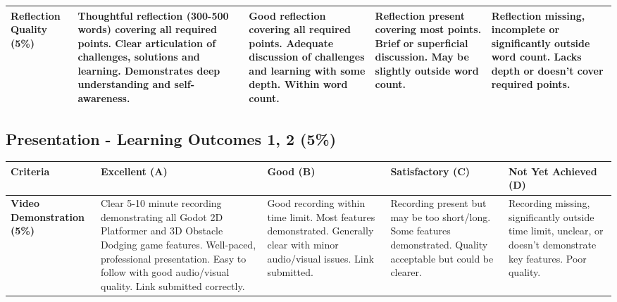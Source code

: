 \documentclass{article}
\begin{document}
\begin{landscape}
\begin{tabular}{|p{5cm}|p{4cm}|p{4cm}|p{4cm}|p{4cm}|}
\textbf{Reflection Quality (5\%)} & 
Thoughtful reflection (300-500 words) covering all required points. Clear articulation of challenges, solutions and learning. Demonstrates deep understanding and self-awareness. & 
Good reflection covering all required points. Adequate discussion of challenges and learning with some depth. Within word count. & 
Reflection present covering most points. Brief or superficial discussion. May be slightly outside word count. & 
Reflection missing, incomplete or significantly outside word count. Lacks depth or doesn't cover required points. \\ \hline

\end{tabular}

\subsection*{Presentation - Learning Outcomes 1, 2 (5\%)}

\begin{tabular}{|p{5cm}|p{4cm}|p{4cm}|p{4cm}|p{4cm}|}
\hline
\textbf{Criteria} & \textbf{Excellent (A)} & \textbf{Good (B)} & \textbf{Satisfactory (C)} & \textbf{Not Yet Achieved (D)} \\ \hline

\textbf{Video Demonstration (5\%)} & 
Clear 5-10 minute recording demonstrating all Godot 2D Platformer and 3D Obstacle Dodging game features. Well-paced, professional presentation. Easy to follow with good audio/visual quality. Link submitted correctly. & 
Good recording within time limit. Most features demonstrated. Generally clear with minor audio/visual issues. Link submitted. & 
Recording present but may be too short/long. Some features demonstrated. Quality acceptable but could be clearer. & 
Recording missing, significantly outside time limit, unclear, or doesn't demonstrate key features. Poor quality. \\ \hline

\end{tabular}
\end{landscape}
\restoregeometry
\end{document}
